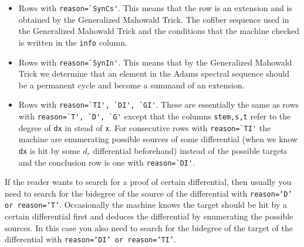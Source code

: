 \documentclass{amsart}
\numberwithin{equation}{section}
\begin{document}
\begin{itemize}
    \item Rows with \verb|reason=`SynCs'|. This means that the row is an extension and is obtained by the Generalized Mahowald Trick. The cofiber sequence used in the Generalized Mahowald Trick and the conditions that the machine checked is written in the \verb|info| column.
    \item Rows with \verb|reason=`SynIn'|. This means that by the Generalized Mahowald Trick we determine that an element in the Adams spectral sequence should be a permanent cycle and become a summand of an extension.
    \item Rows with \verb|reason=`TI', `DI', `GI'|. These are essentially the same as rows with \verb|reason=`T', `D', `G'| except that the columns \verb|stem,s,t| refer to the degree of \verb|dx| in stead of \verb|x|. For consecutive rows with \verb|reason=`TI'| the machine are enumerating possible sources of some differential (when we know \verb|dx| is hit by some $d_r$ differential beforehand) instead of the possible targets and the conclusion row is one with \verb|reason=`DI'|.
\end{itemize}

\begin{remark}
    If the reader wants to search for a proof of certain differential, then usually you need to search for the bidegree of the source of the differential with \texttt{reason=`D' or reason=`T'}. Occasionally the machine knows the target should be hit by a certain differential first and deduces the differential by enumerating the possible sources. In this case you also need to search for the bidegree of the target of the differential with \texttt{reason=`DI' or reason=`TI'}.
\end{remark}
\end{document}
